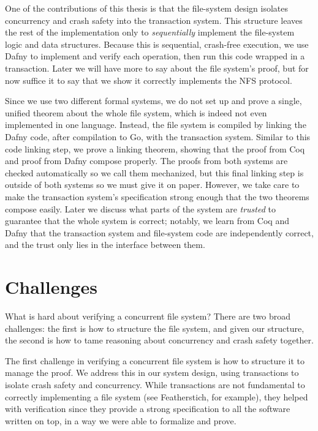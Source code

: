 One of the contributions of this thesis is that the file-system design isolates
concurrency and crash safety into the transaction system. This structure leaves
the rest of the implementation only to \emph{sequentially} implement the
file-system logic and data structures. Because this is sequential, crash-free
execution, we use Dafny to implement and verify each operation, then run this
code wrapped in a transaction. Later we will have more to say about the file
system's proof, but for now suffice it to say that we show it correctly
implements the NFS protocol.

Since we use two different formal systems, we do not set up and prove a single,
unified theorem about the whole file system, which is indeed not even
implemented in one language. Instead, the file system is compiled by linking the
Dafny code, after compilation to Go, with the transaction system. Similar to
this code linking step, we prove a linking theorem, showing that the proof from
Coq and proof from Dafny compose properly. The proofs from both systems are
checked automatically so we call them mechanized, but this final linking step is
outside of both systems so we must give it on paper. However, we take care to
make the transaction system's specification strong enough that the two theorems
compose easily. Later we discuss what parts of the system are \emph{trusted} to
guarantee that the whole system is correct; notably, we learn from Coq and Dafny
that the transaction system and file-system code are independently correct, and
the trust only lies in the interface between them.

\section{Challenges}

What is hard about verifying a concurrent file system? There are two broad
challenges: the first is how to structure the file system, and given our
structure, the second is how to tame reasoning about concurrency and crash
safety together.

The first challenge in verifying a concurrent file system is how to structure it
to manage the proof. We address this in our system design, using transactions to
isolate crash safety and concurrency. While transactions are not fundamental to
correctly implementing a file system (see Featherstich, for example), they
helped with verification since they provide a strong specification to all the
software written on top, in a way we were able to formalize and prove.

